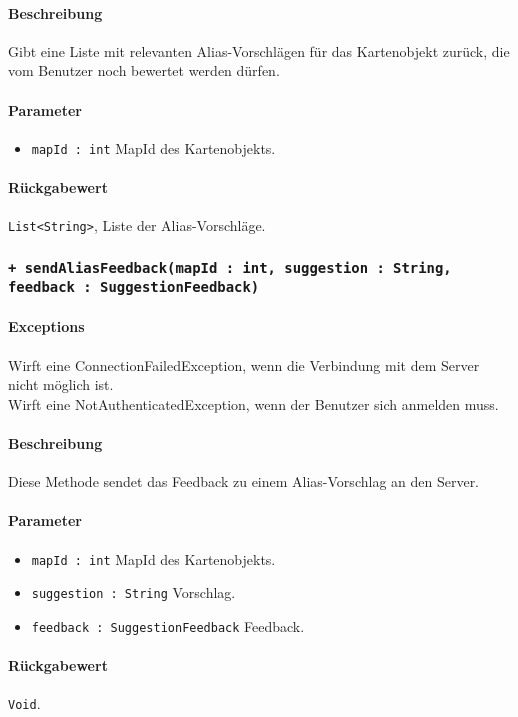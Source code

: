 \paragraph*{Beschreibung}
Gibt eine Liste mit relevanten Alias-Vorschlägen für das Kartenobjekt zurück, 
die vom Benutzer noch bewertet werden dürfen.
\paragraph*{Parameter}
\begin{itemize}
    \item \texttt{mapId : int} MapId des Kartenobjekts.
\end{itemize}
\paragraph*{Rückgabewert}
\texttt{List<String>}, Liste der Alias-Vorschläge.

\subsubsection*{\texttt{+ sendAliasFeedback(mapId : int, suggestion : String, feedback : SuggestionFeedback)}}%
\paragraph*{Exceptions}
Wirft eine ConnectionFailedException, wenn die Verbindung mit dem Server nicht möglich ist.\\
Wirft eine NotAuthenticatedException, wenn der Benutzer sich anmelden muss.
\paragraph*{Beschreibung}
Diese Methode sendet das Feedback zu einem Alias-Vorschlag an den Server.
\paragraph*{Parameter}
\begin{itemize}
    \item \texttt{mapId : int} MapId des Kartenobjekts.
    \item \texttt{suggestion : String} Vorschlag. 
    \item \texttt{feedback : SuggestionFeedback} Feedback.
\end{itemize}
\paragraph*{Rückgabewert}
\texttt{Void}.